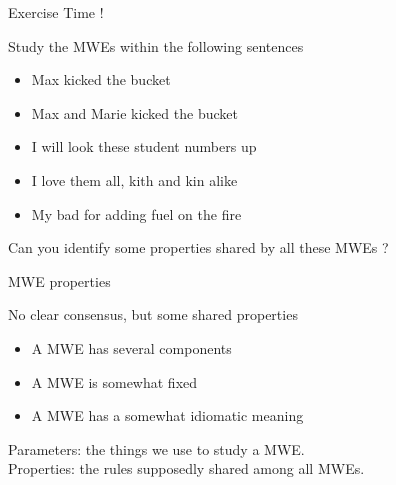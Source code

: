 \documentclass[serif, aspectratio=169]{beamer}
\begin{document}
\begin{exoframe}{Exercise Time !}
    \begin{block}{Study the MWEs within the following sentences}
        \begin{itemize} \color{white}
            \item Max kicked the bucket
            \item Max and Marie kicked the bucket
            \item I will look these student numbers up
            \item I love them all, kith and kin alike
            \item My bad for adding fuel on the fire
        \end{itemize}
    \end{block}
    \pause
    \vfill
    \begin{center}
        \Large
        Can you identify some properties shared by all these MWEs ?
    \end{center}
\end{exoframe}

\begin{frame}{MWE properties}
    \pause
    \begin{block}{No clear consensus, but some shared properties}
        \begin{itemize}
            \item[1.] A MWE has several components
            \item[2.] A MWE is somewhat fixed
            \item[3.] A MWE has a somewhat idiomatic meaning
        \end{itemize}
    \end{block}
    \vfill
    \pause
    \begin{center}
        \Large
        Parameters: the things we use to study a MWE. \\
        Properties: the rules supposedly shared among all MWEs.
    \end{center}
\end{frame}
\end{document}
